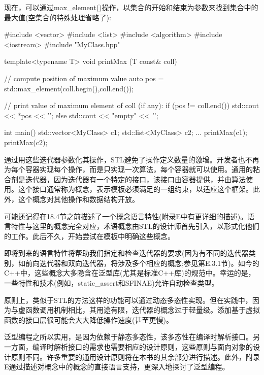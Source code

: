 现在，可以通过max\_element()操作，以集合的开始和结束为参数来找到集合中的最大值(空集合的特殊处理省略了):

\begin{cpp}
#include <vector>
#include <list>
#include <algorithm>
#include <iostream>
#include "MyClass.hpp"

template<typename T>
void printMax (T const& coll)
{
	// compute position of maximum value
	auto pos = std::max_element(coll.begin(),coll.end());
	
	// print value of maximum element of coll (if any):
	if (pos != coll.end()) {
		std::cout << *pos << ’\n’;
	}
	else {
		std::cout << "empty" << ’\n’;
	}
}

int main()
{
	std::vector<MyClass> c1;
	std::list<MyClass> c2;
	...
	printMax(c1);
	printMax(c2);
}
\end{cpp}

通过用这些迭代器参数化其操作，STL避免了操作定义数量的激增。开发者也不再为每个容器实现每个操作，而是只实现一次算法，每个容器就可以使用。通用的粘合剂是迭代器，因为迭代器有一个特定的接口，该接口由容器提供，并由算法使用。这个接口通常称为概念，表示模板必须满足的一组约束，以适应这个框架。此外，这个概念对其他操作和数据结构开放。

可能还记得在18.4节之前描述了一个概念语言特性(附录E中有更详细的描述)。语言特性与这里的概念完全对应，术语概念由STL的设计师首先引入，以形式化他们的工作。此后不久，开始尝试在模板中明确这些概念。

即将到来的语言特性将帮助我们指定和检查迭代器的要求(因为有不同的迭代器类别，如前向迭代器和双向迭代器，将涉及多个相应的概念;参见第E.3.1节)。如今的C++中，这些概念大多隐含在泛型库(尤其是标准C++库)的规范中。幸运的是，一些特性和技术(例如，static\_assert和SFINAE)允许自动检查类型。

原则上，类似于STL的方法这样的功能可以通过动态多态性实现。但在实践中，因为与虚函数调用机制相比，其用途有限，迭代器的概念过于轻量级。添加基于虚拟函数的接口层很可能会大大降低操作速度(甚至更慢)。

泛型编程之所以实用，是因为依赖于静态多态性，该多态性在编译时解析接口。另一方面，编译时解析接口的需求也需要相应的设计原则，这些原则与面向对象的设计原则不同。许多重要的通用设计原则将在本书的其余部分进行描述。此外，附录E通过描述对概念中的概念的直接语言支持，更深入地探讨了泛型编程。























